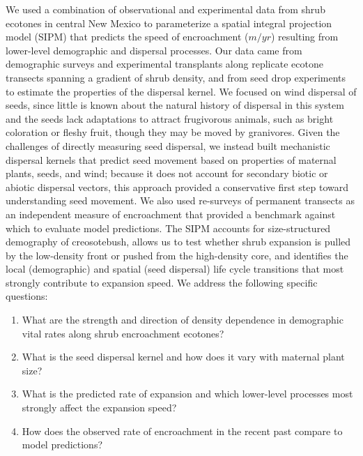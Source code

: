 \documentclass[11pt]{article}\usepackage[]{graphicx}\usepackage[]{color}
\begin{document}
We used a combination of observational and experimental data from shrub ecotones in central New Mexico to parameterize a spatial integral projection model (SIPM) that predicts the speed of encroachment ($m/yr$) resulting from lower-level demographic and dispersal processes. 
Our data came from demographic surveys and experimental transplants along replicate ecotone transects spanning a gradient of shrub density, and from seed drop experiments to estimate the properties of the dispersal kernel.
We focused on wind dispersal of seeds, since little is known about the natural history of dispersal in this system and the seeds lack adaptations to attract frugivorous animals, such as bright coloration or fleshy fruit, though they may be moved by granivores.
Given the challenges of directly measuring seed dispersal, we instead built mechanistic dispersal kernels that predict seed movement based on properties of maternal plants, seeds, and wind; because it does not account for secondary biotic or abiotic dispersal vectors, this approach provided a conservative first step toward understanding seed movement.
We also used re-surveys of permanent transects as an independent measure of encroachment that provided a benchmark against which to evaluate model predictions. 
The SIPM accounts for size-structured demography of creosotebush, allows us to test whether shrub expansion is pulled by the low-density front or pushed from the high-density core, and identifies the local (demographic) and spatial (seed dispersal) life cycle transitions that most strongly contribute to expansion speed. 
We address the following specific questions: 
\begin{enumerate}
\item What are the strength and direction of density dependence in demographic vital rates along shrub encroachment ecotones?
\item What is the seed dispersal kernel and how does it vary with maternal plant size?
\item What is the predicted rate of expansion and which lower-level processes most strongly affect the expansion speed?
\item How does the observed rate of encroachment in the recent past compare to model predictions?

\end{enumerate}
\end{document}
